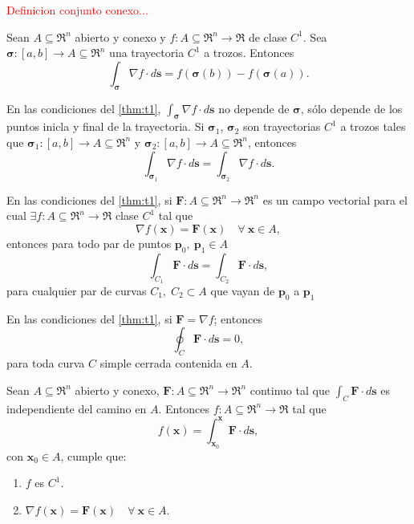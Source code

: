 \begin{definition}
    \textcolor{red}{Definicion conjunto conexo...}
\end{definition}

\begin{theorem} \label{thm:t1}
    Sean $A\subseteq\Re^n$ abierto y conexo y $f:A\subseteq\Re^n\to\Re$ de clase $C^1$. Sea $\boldsymbol{\sigma}:[a,b]\to A\subseteq\Re^n$ una trayectoria $C^1$ a trozos. Entonces
    \[
       \int_{\boldsymbol{\sigma}}\nabla f\cdot d\mathbf{s}=f(\boldsymbol{\sigma}(b))-f(\boldsymbol{\sigma}(a)).
    \]    
\end{theorem}

\begin{corollary}
    En las condiciones del \autoref{thm:t1}, $\int_{\boldsymbol{\sigma}}\nabla f\cdot d\mathbf{s}$ no depende de $\boldsymbol{\sigma}$, s\'olo depende de los puntos inicla y final de la trayectoria. Si $\boldsymbol{\sigma}_1$, $\boldsymbol{\sigma}_2$ son trayectorias $C^1$ a trozos tales que $\boldsymbol{\sigma}_1:[a,b]\to A\subseteq\Re^n$ y $\boldsymbol{\sigma}_2:[a,b]\to A\subseteq\Re^n$, entonces
    $$\int_{\boldsymbol{\sigma}_1}\nabla f\cdot d\mathbf{s}=\int_{\boldsymbol{\sigma}_2}\nabla f\cdot d\mathbf{s}.$$
\end{corollary}

\begin{corollary}
    En las condiciones del \autoref{thm:t1}, si $\mathbf{F}:A\subseteq\Re^n\to\Re^n$ es un campo vectorial para el cual $\exists f:A\subseteq\Re^n\to\Re$ clase $C^1$ tal que 
    $$\nabla f(\mathbf{x})=\mathbf{F}(\mathbf{x})\quad\forall\:\mathbf{x}\in A,$$
    entonces para todo par de puntos $\mathbf{p}_0,\:\mathbf{p}_1\in A$
    $$\int_{C_1}\mathbf{F}\cdot d\mathbf{s}=\int_{C_2}\mathbf{F}\cdot d\mathbf{s},$$
    para cualquier par de curvas $C_1,\;C_2\subset A$ que vayan de $\mathbf{p}_0$ a $\mathbf{p}_1$ 
\end{corollary}

\begin{corollary}
    En las condiciones del \autoref{thm:t1}, si $\mathbf{F}=\nabla f$; entonces
    $$\oint_C\mathbf{F}\cdot d\mathbf{s}=0,$$
    para toda curva $C$ simple cerrada contenida en $A$.
\end{corollary}

\begin{theorem}
    Sean $A\subseteq\Re^n$ abierto y conexo, $\mathbf{F}:A\subseteq\Re^n\to\Re^n$ continuo tal que $\int_C \mathbf{F}\cdot d\mathbf{s}$ es independiente del camino en $A$. Entonces $f:A\subseteq\Re^n\to\Re$ tal que
    $$f(\mathbf{x})=\int_{\mathbf{x}_0}^{\mathbf{x}}\mathbf{F}\cdot d\mathbf{s},$$
    con $\mathbf{x}_0\in A$, cumple que: 
    \begin{enumerate}
        \item $f$ es $C^1$.
        \item $\nabla f(\mathbf{x})=\mathbf{F}(\mathbf{x})\quad\forall\:\mathbf{x}\in A.$
    \end{enumerate}
\end{theorem}

